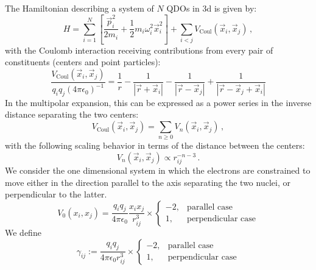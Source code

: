 \documentclass[reprint, amsmath, amssymb, aps]{revtex4-2}
\begin{document}
    The Hamiltonian describing a system of $N$ QDOs in 3d is given by:
    \begin{equation}
    \label{eq:full_QDO_Hamiltonian}
        H=\sum_{i=1}^N\left[\frac{\vec p_i^2}{2m_i} + \frac{1}{2}m_i\omega_i^2\vec x_i^2\right] +\sum_{i<j}V_\text{Coul}\left(\vec x_i, \vec x_j\right)\,,
    \end{equation}
    with the Coulomb interaction receiving contributions from every pair of constituents (centers and point particles):
    \begin{equation*}
        \frac{V_\text{Coul}\left(\vec x_i, \vec x_j\right)}{q_iq_j(4\pi\epsilon_0)^{-1}}=\frac{1}{r} - \frac{1}{|\vec r + \vec x_i|} - \frac{1}{|\vec r - \vec x_j|} + \frac{1}{|\vec r - \vec x_j + \vec x_i|}
    \end{equation*}
    In the multipolar expansion, this can be expressed as a power series in the inverse distance separating the two centers:
    \begin{equation*}
        V_\text{Coul}\left(\vec x_i, \vec x_j\right)= \sum_{n\geq 0} V_n\left(\vec x_i, \vec x_j\right)\,,
    \end{equation*}
    with the following scaling behavior in terms of the distance between the centers:
    \begin{equation*}
        V_n\left(\vec x_i, \vec x_j\right)\propto r_{ij}^{-n-3}\,.
    \end{equation*}
    We consider the one dimensional system in which the electrons are constrained to move either in the direction parallel to the axis separating the two nuclei, or perpendicular to the latter.
    \begin{equation}
        V_0(x_i, x_j) = \frac{q_iq_j}{4\pi\epsilon_0}\frac{x_ix_j}{r_{ij}^3}\times
        \begin{cases}
            -2, & \text{parallel case} \\
            1, & \text{perpendicular case}
        \end{cases}
    \end{equation}
    We define
    \begin{equation}
        \gamma_{ij} := \frac{q_iq_j}{4\pi\epsilon_0r_{ij}^3}\times
        \begin{cases}
            -2, & \text{parallel case} \\
            1, & \text{perpendicular case}
        \end{cases}
    \end{equation}
\end{document}
